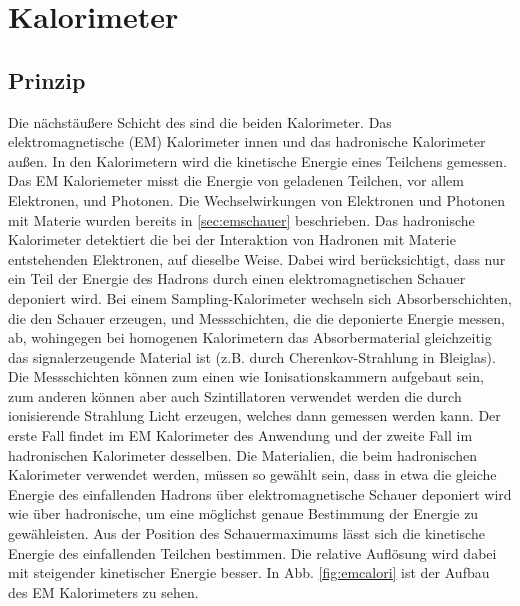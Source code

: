 \section{Kalorimeter}\label{sec:calori}
\subsection{Prinzip}
Die nächstäußere Schicht des \atlas sind die beiden Kalorimeter. Das elektromagnetische (EM) Kalorimeter innen und das hadronische Kalorimeter außen. In den Kalorimetern wird die kinetische Energie eines Teilchens gemessen. Das EM Kaloriemeter misst die Energie von geladenen Teilchen, vor allem Elektronen, und Photonen. Die Wechselwirkungen von Elektronen und Photonen mit Materie wurden bereits in \ref{sec:emschauer} beschrieben. Das hadronische Kalorimeter detektiert die bei der Interaktion von Hadronen mit Materie entstehenden Elektronen, auf dieselbe Weise. Dabei wird berücksichtigt, dass nur ein Teil der Energie des Hadrons durch einen elektromagnetischen Schauer deponiert wird.
Bei einem Sampling-Kalorimeter wechseln sich Absorberschichten, die den Schauer erzeugen, und Messschichten, die die deponierte Energie messen, ab, wohingegen bei homogenen Kalorimetern das Absorbermaterial gleichzeitig das signalerzeugende Material ist (z.B. durch Cherenkov-Strahlung in Bleiglas). Die Messschichten können zum einen wie Ionisationskammern aufgebaut sein, zum anderen können aber auch Szintillatoren verwendet werden die durch ionisierende Strahlung Licht erzeugen, welches dann gemessen werden kann. Der erste Fall findet im EM Kalorimeter des \atlas Anwendung\cite{Aad:2014una} und der zweite Fall im hadronischen Kalorimeter desselben\cite{Meyer:2013joa}. Die Materialien, die beim hadronischen Kalorimeter verwendet werden, müssen so gewählt sein, dass in etwa die gleiche Energie des einfallenden Hadrons über elektromagnetische Schauer deponiert wird wie über hadronische, um eine möglichst genaue Bestimmung der Energie zu gewähleisten.
Aus der Position des Schauermaximums lässt sich die kinetische Energie des einfallenden Teilchen bestimmen. 
Die relative Auflösung wird dabei mit steigender kinetischer Energie besser. In Abb. \ref{fig:emcalori} ist der Aufbau des EM Kalorimeters zu sehen.

